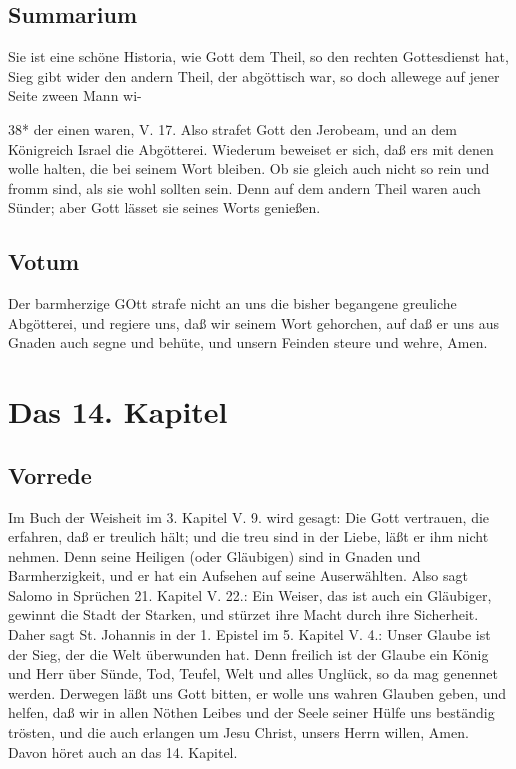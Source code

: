 \section{Summarium}

Sie ist eine schöne Historia, wie Gott dem Theil, so den rechten Gottesdienst hat, Sieg gibt wider den andern Theil, der abgöttisch war, so doch allewege auf jener Seite zween Mann wi-

38*
der einen waren, V. 17. Also strafet Gott den Jerobeam, und an dem Königreich Israel die Abgötterei. Wiederum beweiset er sich, daß ers mit denen wolle halten, die bei seinem Wort bleiben. Ob sie gleich auch nicht so rein und fromm sind, als sie wohl sollten sein. Denn auf dem andern Theil waren auch Sünder; aber Gott lässet sie seines Worts genießen.

\section{Votum}

Der barmherzige GOtt strafe nicht an uns die bisher begangene greuliche Abgötterei, und regiere uns, daß wir seinem Wort gehorchen, auf daß er uns aus Gnaden auch segne und behüte, und unsern Feinden steure und wehre, Amen.

\chapter{Das 14. Kapitel}

\section{Vorrede}

Im Buch der Weisheit im 3. Kapitel V. 9. wird gesagt: Die Gott vertrauen, die erfahren, daß er treulich hält; und die treu sind in der Liebe, läßt er ihm nicht nehmen. Denn seine Heiligen (oder Gläubigen) sind in Gnaden und Barmherzigkeit, und er hat ein Aufsehen auf seine Auserwählten. Also sagt Salomo in Sprüchen 21. Kapitel V. 22.: Ein Weiser, das ist auch ein Gläubiger, gewinnt die Stadt der Starken, und stürzet ihre Macht durch ihre Sicherheit. Daher sagt St. Johannis in der 1. Epistel im 5. Kapitel V. 4.: Unser Glaube ist der Sieg, der die Welt überwunden hat. Denn freilich ist der Glaube ein König und Herr über Sünde, Tod, Teufel, Welt und alles Unglück, so da mag genennet werden. Derwegen läßt uns Gott bitten, er wolle uns wahren Glauben geben, und helfen, daß wir in allen Nöthen Leibes und der Seele seiner Hülfe uns beständig trösten, und die auch erlangen um Jesu Christ, unsers Herrn willen, Amen. Davon höret auch an das 14. Kapitel.

